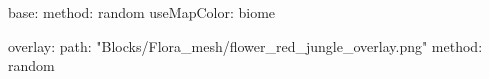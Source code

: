 base:
  method: random
  useMapColor: biome
  
overlay:
  path: "Blocks/Flora_mesh/flower_red_jungle_overlay.png"
  method: random